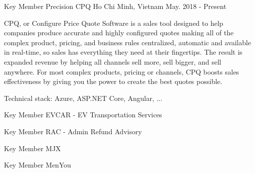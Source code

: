 

\begin{cventries}

  \cventry
    {Key Member} %
    {Precision CPQ} %
    {Ho Chi Minh, Vietnam} %
    {May. 2018 - Present} %
    {
      \begin{cvitems} %
        \item {CPQ, or Configure Price Quote Software is a sales tool designed to help companies produce accurate and highly configured quotes making all of the complex product, pricing, and business rules centralized, automatic and available in real-time, so sales has everything they need at their fingertips. The result is expanded revenue by helping all channels sell more, sell bigger, and sell anywhere. For most complex products, pricing or channels, CPQ boosts sales effectiveness by giving you the power to create the best quotes possible.}
        \item {Technical stack: Azure, ASP.NET Core, Angular, ...}
      \end{cvitems}
    }

  \cventry
    {Key Member} %
    {EVCAR - EV Transportation Services} %

  \cventry
    {Key Member} %
    {RAC - Admin Refund Advisory} %

  \cventry
    {Key Member} %
    {MJX} %

  \cventry
    {Key Member} %
    {MenYou} %


\end{cventries}
